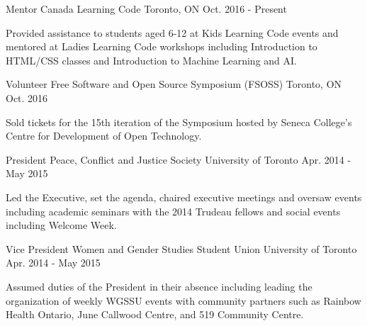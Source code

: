 

\begin{cventries}

  \cventry
    {Mentor} %
    {Canada Learning Code} %
    {Toronto, ON} %
    {Oct. 2016 - Present} %
    {
      \begin{cvitems} %
        \item {Provided assistance to students aged 6-12 at Kids Learning Code events and mentored at Ladies Learning Code workshops including Introduction to HTML/CSS classes and Introduction to Machine Learning and AI.}
      \end{cvitems}
    }

  \cventry
    {Volunteer} %
    {Free Software and Open Source Symposium (FSOSS)} %
    {Toronto, ON} %
    {Oct. 2016} %
    {
      \begin{cvitems} %
        \item {Sold tickets for the 15th iteration of the Symposium hosted by Seneca College’s Centre for Development of Open Technology.}
      \end{cvitems}
    }

  \cventry
    {President} %
    {Peace, Conflict and Justice Society} %
    {University of Toronto} %
    {Apr. 2014 - May 2015} %
    {
      \begin{cvitems} %
        \item {Led the Executive, set the agenda, chaired executive meetings and oversaw events including academic seminars with the 2014 Trudeau fellows and social events including Welcome Week.}
      \end{cvitems}
    }

  \cventry
    {Vice President} %
    {Women and Gender Studies Student Union } %
    {University of Toronto} %
    {Apr. 2014 - May 2015} %
    {
      \begin{cvitems} %
        \item {Assumed duties of the President in their absence including leading the organization of weekly WGSSU events with community partners such as Rainbow Health Ontario, June Callwood Centre, and 519 Community Centre.}
      \end{cvitems}
    }


\end{cventries}
